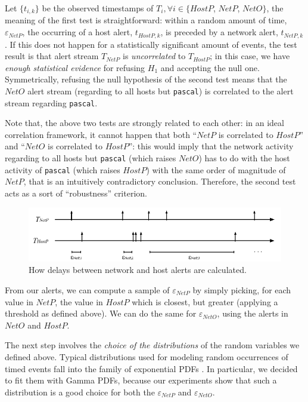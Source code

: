 Let $\{t_{i,k}\}$ be the observed timestamps of $T_{i}, \forall i \in \{HostP$, $NetP$, $NetO\}$, the meaning of the first test is straightforward: within a random amount of time, $\varepsilon_{NetP}$, the occurring of a host alert, $t_{HostP,k}$, is preceded by a network alert, $t_{NetP,k}$. If this does not happen for a statistically significant amount of events, the test result is that alert stream $T_{NetP}$ is \emph{uncorrelated} to $T_{HostP}$; in this case, we have \emph{enough statistical evidence} for refusing $H_{1}$ and accepting the null one. Symmetrically, refusing the null hypothesis of the second test means that the $NetO$ alert stream (regarding to all hosts but \texttt{pascal}) is correlated to the alert stream regarding \texttt{pascal}.

Note that, the above two tests are strongly related to each other: in an ideal correlation framework, it cannot happen that both ``$NetP$ is correlated to $HostP$'' and ``$NetO$ is correlated to $HostP$'': this would imply that the network activity regarding to all hosts but \texttt{pascal} (which raises $NetO$) has to do with the host activity of \texttt{pascal} (which raises $HostP$) with the same order of magnitude of $NetP$, that is an intuitively contradictory conclusion. Therefore, the second test acts as a sort of ``robustness'' criterion.

\begin{figure}[t]
  \centering
  \includegraphics[width=\textwidth]{figures/correlation/causality/epsilon}
  \caption{How delays between network and host alerts are calculated.}
  \label{fig:epsilon}
\end{figure}

From our alerts, we can compute a sample of $\varepsilon_{NetP}$ by simply picking, for each value in $NetP$, the value in $HostP$ which is closest, but greater (applying a threshold as defined above). We can do the same for $\varepsilon_{NetO}$, using the alerts in $NetO$ and $HostP$.

The next step involves the \emph{choice of the distributions} of the random variables we defined above. Typical distributions used for modeling random occurrences of timed events fall into the family of exponential \acp{PDF} \citep{pestman}. In particular, we decided to fit them with Gamma \acp{PDF}, because our experiments show that such a distribution is a good choice for both the $\varepsilon_{NetP}$ and $\varepsilon_{NetO}$.

